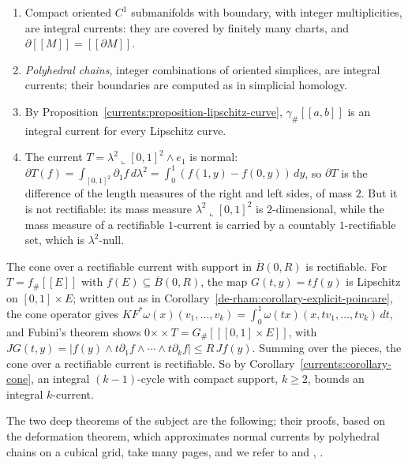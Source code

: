 \begin{example}\label{currents:example-integral-currents}
\begin{enumerate}
\item Compact oriented $C^1$ submanifolds with boundary, with integer multiplicities, are integral currents: they are covered by finitely many charts, and $\partial[\![M]\!] = [\![\partial M]\!]$.
\item \emph{Polyhedral chains}, integer combinations of oriented simplices, are integral currents; their boundaries are computed as in simplicial homology.
\item By Proposition~\ref{currents:proposition-lipschitz-curve}, $\gamma_\#[\![a, b]\!]$ is an integral current for every Lipschitz curve.
\item The current $T = \lambda^2\llcorner[0, 1]^2 \wedge e_1$ is normal: $\partial T(f) = \int_{[0, 1]^2}\partial_1f\,d\lambda^2 = \int_0^1(f(1, y) - f(0, y))\,dy$, so $\partial T$ is the difference of the
length measures of the right and left sides, of mass $2$. But it is not rectifiable: its mass measure $\lambda^2\llcorner[0, 1]^2$ is $2$-dimensional, while the mass measure of a rectifiable $1$-current is
carried by a countably $1$-rectifiable set, which is $\lambda^2$-null.
\end{enumerate}
\end{example}

The cone over a rectifiable current with support in $\overline{B}(0, R)$ is rectifiable. For $T = f_\#[\![E]\!]$ with $f(E) \subseteq \overline{B}(0, R)$, the map $G(t, y) = tf(y)$ is Lipschitz on $[0, 1] \times E$; written out as in
Corollary~\ref{de-rham:corollary-explicit-poincare}, the cone operator gives $KF^*\omega(x)(v_1, \ldots, v_k) = \int_0^1\omega(tx)(x, tv_1, \ldots, tv_k)\,dt$, and Fubini's theorem shows
$0 \mathbin{\times\!\!\!\!\times} T = G_\#[\![[0, 1] \times E]\!]$, with $JG(t, y) = |f(y) \wedge t\partial_1f \wedge \cdots \wedge t\partial_kf| \leq R\,Jf(y)$. Summing over the pieces, the cone over a rectifiable current is rectifiable. So by Corollary~\ref{currents:corollary-cone}, an integral $(k-1)$-cycle with compact
support, $k \geq 2$, bounds an integral $k$-current.

The two deep theorems of the subject are the following; their proofs, based on the deformation theorem, which approximates normal currents by polyhedral chains on a cubical grid, take many pages, and we
refer to \cite{federer-fleming-1960} and \cite[4.2]{federer-gmt}, \cite[Chapter 6]{simon-gmt}.

